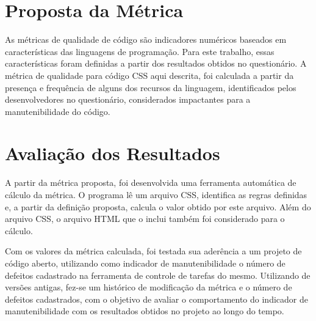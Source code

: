 \section{Proposta da Métrica}

As métricas de qualidade de código são indicadores numéricos baseados em características das linguagens de programação. Para este trabalho, essas características foram definidas a partir dos resultados obtidos no questionário. A métrica de qualidade para código CSS aqui descrita, foi calculada a partir da presença e frequência de alguns dos recursos da linguagem, identificados pelos desenvolvedores no questionário, considerados impactantes para a manutenibilidade do código.

\section{Avaliação dos Resultados}

A partir da métrica proposta, foi desenvolvida uma ferramenta automática de cálculo da métrica. O programa lê um arquivo CSS, identifica as regras definidas e, a partir da definição proposta, calcula o valor obtido por este arquivo. Além do arquivo CSS, o arquivo HTML que o inclui também foi considerado para o cálculo.

Com os valores da métrica calculada, foi testada sua aderência a um projeto de código aberto, utilizando como indicador de manutenibilidade o número de defeitos cadastrado na ferramenta de controle de tarefas do mesmo. Utilizando de versões antigas, fez-se um histórico de modificação da métrica e o número de defeitos cadastrados, com o objetivo de avaliar o comportamento do indicador de manutenibilidade com os resultados obtidos no projeto ao longo do tempo.
